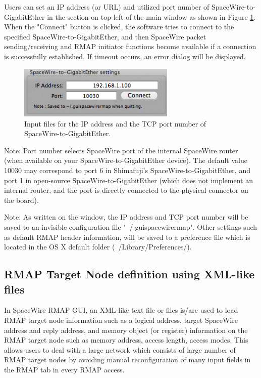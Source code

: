 \documentclass[a4paper,10pt]{article}
\begin{document}
Users can set an IP address (or URL) and utilized port number of SpaceWire-to-GigabitEther in the section on top-left of the main window as shown in Figure \ref{figure:section_SpaceWire-to-GigabitEther}. When the "Connect" button is clicked, the software tries to connect to the specified SpaceWire-to-GigabitEther, and then SpaceWire packet sending/receiving and RMAP initiator functions become available if a connection is successfully established. If timeout occurs, an error dialog will be displayed.

\begin{figure}[htb]
\begin{center}
\includegraphics[height=2.5cm]{figures/SpaceWireRMAPGUI/Section_SpaceWire-to-GigabitEther_settings.png}
\caption{Input files for the IP address and the TCP port number of SpaceWire-to-GigabitEther.}
\label{figure:section_SpaceWire-to-GigabitEther}
\end{center}
\end{figure}

Note: Port number selects SpaceWire port of the internal SpaceWire router (when available on your SpaceWire-to-GigabitEther device). The default value 10030 may correspond to port 6 in Shimafuji's SpaceWire-to-GigabitEther, and port 1 in open-source SpaceWire-to-GigabitEther (which does not implement an internal router, and the port is directly connected to the physical connector on the board).

Note: As written on the window, the IP address and TCP port number will be saved to an invisible configuration file "~/.guispacewirermap". Other settings such as default RMAP header information, will be saved to a preference file which is located in the OS X default folder (~/Library/Preferences/).

\subsection{RMAP Target Node definition using XML-like files}\label{section:configuration_section}
In SpaceWire RMAP GUI, an XML-like text file or files is/are used to load RMAP target node information such as a logical address, target SpaceWire address and reply address, and memory object (or register) information on the RMAP target node such as memory address, access length, access modes. This allows users to deal  with a large network which consists of large number of RMAP target nodes by avoiding manual reconfiguration of many input fields in the RMAP tab in every RMAP access.
\end{document}
